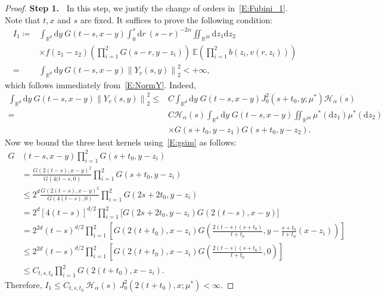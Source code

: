 \documentclass[a4paper,11pt]{article}%
\theoremstyle{plain}
\theoremstyle{definition}
\numberwithin{equation}{section}
\newcommand{\R}{\mathbb{R}}
\newcommand{\E}{\mathbb{E}}
\newcommand{\Norm}[1]{\left\| #1 \right\|}
\newcommand{\ud}{\ensuremath{\mathrm{d}}}
\begin{document}
\begin{proof}
  \textbf{\noindent Step 1.~} In this step, we justify the change of orders in~\eqref{E:Fubini_1}.
  Note that $t, x$ and $s$ are fixed. It suffices to prove the following condition:
  \begin{align*}
    I_1\coloneqq & \int_{\R^d}\ud y \: G(t-s,x-y) \int_0^s \ud r\: (s-r)^{-2\alpha} \iint_{\R^{2d}} \ud z_1\ud z_2\:                \\
                 & \times f(z_1-z_2) \left(\prod_{i = 1}^{2} G(s-r,y-z_i)\right) \: \E\left(\prod_{i = 1}^{2}b(z_i,v(r,z_i))\right) \\
       =         & \int_{\R^d}\ud y \: G(t-s,x-y) \Norm{Y_v(s,y)}_2^2 < +\infty,
  \end{align*}
  which follows immediately from~\eqref{E:NormY}. Indeed,
  \begin{align*}
    \int_{\R^d}\ud y \: G(t-s,x-y) \Norm{Y_v(s,y)}_2^2
    \le & C \int_{\R^d} \ud y \; G(t-s,x-y) J_0^2 (s+t_0,y;\mu^*) \mathcal{H}_\alpha(s)                        \\
     =  & C \mathcal{H}_\alpha(s) \int_{\R^d} \ud y \; G(t-s,x-y)\iint_{\R^{2d}}\mu^* (\ud z_1)\mu^* (\ud z_2) \\
        & \times G\left(s+t_0,y-z_1\right)G\left(s+t_0,y-z_2\right).
  \end{align*}
  Now we bound the three heat kernels using~\eqref{E:gsim} as follows:
  \begin{align*}
     G & (t-s,x-y) \prod_{i = 1}^{2}G(s+t_0,y- z_i)                                                                                                              \\
       & = \frac{G\left(2(t-s),x-y\right)^2}{G\left(4(t-s,0\right)} \prod_{i = 1}^{2}G\left(s+t_0,y- z_i\right)                                                  \\
       & \le 2^d \frac{G\left(2(t-s),x-y\right)^2}{G\left(4(t-s),0\right)} \prod_{i = 1}^{2}G\left(2s+2t_0,y- z_i\right)                                         \\
       & = 2^d [4(t-s)]^{d/2} \prod_{i = 1}^{2}\bigg[ G\left(2s+2t_0,y- z_i\right)G\left(2(t-s),x-y\right)\bigg]                                                 \\
       & = 2^{2d} (t-s)^{d/2} \prod_{i = 1}^{2}\left[G\left(2(t+t_0),x- z_i\right)G\left(\frac{2(t-s)(s+t_0)}{t+t_0},y-\frac{s+t_0}{t+t_0}(x- z_i)\right)\right] \\
       & \le 2^{2d} (t-s)^{d/2} \prod_{i = 1}^{2}\left[G\left(2(t+t_0),x- z_i\right)G\left(\frac{2(t-s)(s+t_0)}{t+t_0},0\right)\right]                           \\
       & \le C_{t,s,t_0} \prod_{i = 1}^{2} G\left(2(t+t_0),x- z_i\right).
  \end{align*}
  Therefore, $I_1\le C_{t,s,t_0} \: \mathcal{H}_{\alpha}(s) \: J_0^2\left(2(t+t_0),x;\mu^*\right)
  <\infty$. \bigskip


\end{proof}
\end{document}
